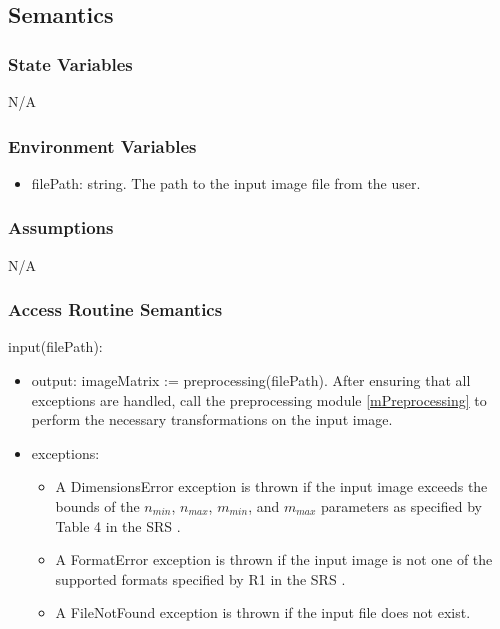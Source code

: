 \documentclass[12pt, titlepage]{article}
\begin{document}
\subsection{Semantics}

\subsubsection{State Variables}

N/A

\subsubsection{Environment Variables}

\begin{itemize}
  \item filePath: string. The path to the input image file from the user.
\end{itemize}

\subsubsection{Assumptions}

N/A

\subsubsection{Access Routine Semantics}

\noindent input(filePath):
\begin{itemize} 
\item output: imageMatrix := preprocessing(filePath). After ensuring that all
exceptions are handled, call the preprocessing module \ref{mPreprocessing} to
perform the necessary transformations on the input image.
\item exceptions:
\begin{itemize}
  \item A DimensionsError exception is thrown if the input image
  exceeds the bounds of the $n_{min}$, $n_{max}$, $m_{min}$, and $m_{max}$
  parameters as specified by Table 4 in the SRS \cite[4.2.6]{SRS}.
  \item A FormatError exception is thrown if the input image is not one of the supported formats
  specified by R1 in the SRS \cite[5.1.1]{SRS}.
  \item A FileNotFound exception is thrown if the input file does not exist.
\end{itemize}
\end{itemize}
\end{document}
